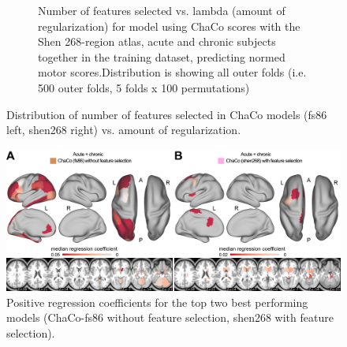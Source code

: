 \documentclass[10pt]{article}
\begin{document}
\begin{figure}
\begin{subfigure}{0.5\textwidth}
  \caption{Number of features selected vs. lambda (amount of regularization) for model using ChaCo scores with the Shen 268-region atlas, acute and chronic subjects together in the training dataset, predicting normed motor scores.Distribution is showing all outer folds (i.e. 500 outer folds, 5 folds x 100 permutations)} 
  \label{fig:sfig2}
\end{subfigure}
\caption{Distribution of number of features selected in ChaCo models (fs86 left, shen268 right) vs. amount of regularization.}
\label{lesion_load_dist}
\end{figure}
\begin{figure}[ht]
\centering
\includegraphics[width=1\linewidth]{figures/Analysis1_posweights.png}
\caption{Positive regression coefficients for the top two best performing models (ChaCo-fs86 without feature selection, shen268 with feature selection).}
\label{smatt_pairwise_correlations_bi}
\end{figure}
\end{document}
